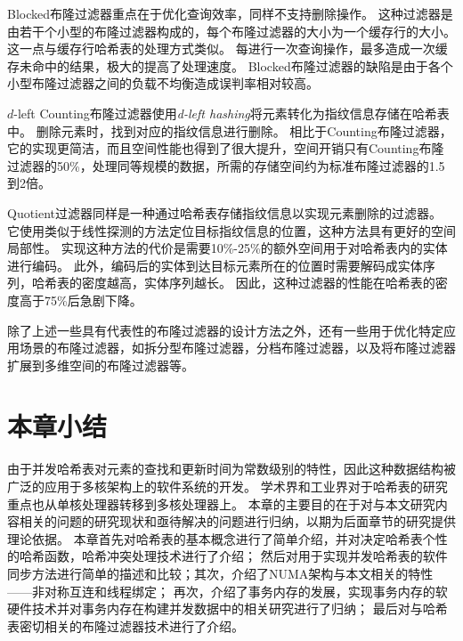 Blocked布隆过滤器\cite{putze2007cache}重点在于优化查询效率，同样不支持删除操作。
这种过滤器是由若干个小型的布隆过滤器构成的，每个布隆过滤器的大小为一个缓存行的大小。
这一点与缓存行哈希表\cite{clht}的处理方式类似。
每进行一次查询操作，最多造成一次缓存未命中的结果，极大的提高了处理速度。
Blocked布隆过滤器的缺陷是由于各个小型布隆过滤器之间的负载不均衡造成误判率相对较高。

$d$-left Counting布隆过滤器\cite{bonomi2006improved}使用\textit{d-left hashing}\cite{mitzenmacher1999asymptotics}将元素转化为指纹信息存储在哈希表中。
删除元素时，找到对应的指纹信息进行删除。
相比于Counting布隆过滤器，它的实现更简洁，而且空间性能也得到了很大提升，空间开销只有Counting布隆过滤器的50\%，处理同等规模的数据，所需的存储空间约为标准布隆过滤器的1.5到2倍。

Quotient过滤器\cite{bender2012don}同样是一种通过哈希表存储指纹信息以实现元素删除的过滤器。
它使用类似于线性探测的方法定位目标指纹信息的位置，这种方法具有更好的空间局部性。
实现这种方法的代价是需要10\%-25\%的额外空间用于对哈希表内的实体进行编码。
此外，编码后的实体到达目标元素所在的位置时需要解码成实体序列，哈希表的密度越高，实体序列越长。
因此，这种过滤器的性能在哈希表的密度高于75\%后急剧下降。

除了上述一些具有代表性的布隆过滤器的设计方法之外，还有一些用于优化特定应用场景的布隆过滤器，如拆分型布隆过滤器\cite{xiaomingzhong2004}，分档布隆过滤器\cite{xiekun2007}，以及将布隆过滤器扩展到多维空间的布隆过滤器\cite{xiekun2008}等。


\section{本章小结}
由于并发哈希表对元素的查找和更新时间为常数级别的特性，因此这种数据结构被广泛的应用于多核架构上的软件系统的开发。
学术界和工业界对于哈希表的研究重点也从单核处理器转移到多核处理器上。
本章的主要目的在于对与本文研究内容相关的问题的研究现状和亟待解决的问题进行归纳，以期为后面章节的研究提供理论依据。
本章首先对哈希表的基本概念进行了简单介绍，并对决定哈希表个性的哈希函数，哈希冲突处理技术进行了介绍；
然后对用于实现并发哈希表的软件同步方法进行简单的描述和比较；其次，介绍了NUMA架构与本文相关的特性——非对称互连和线程绑定；
再次，介绍了事务内存的发展，实现事务内存的软硬件技术并对事务内存在构建并发数据中的相关研究进行了归纳；
最后对与哈希表密切相关的布隆过滤器技术进行了介绍。


